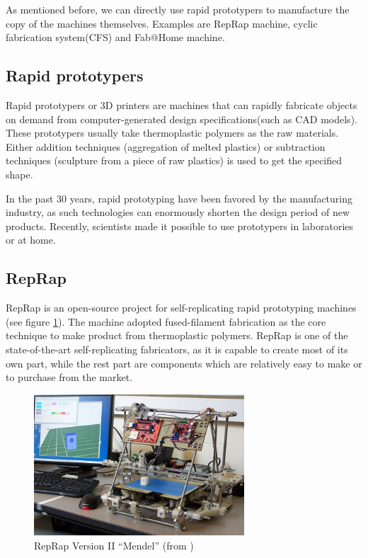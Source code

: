 \documentclass[12pt,twoside]{article}
\theoremstyle{plain}
\theoremstyle{definition}
\theoremstyle{remark}
\begin{document}
As mentioned before, we can directly use rapid prototypers to manufacture the copy of the machines themselves. Examples are RepRap machine\cite{jones_reprap_2011}, cyclic fabrication system(CFS)\cite{moses_towards_2009} and Fab@Home machine\cite{malone_fabhome:_2007}.

\subsection{Rapid prototypers}
Rapid prototypers or 3D printers are machines that can rapidly fabricate objects on demand from computer-generated design specifications(such as CAD models)\cite{lipson_homemade_2005}. These prototypers usually take thermoplastic polymers as the raw materials. Either addition techniques (aggregation of melted plastics) or subtraction techniques (sculpture from a piece of raw plastics) is used to get the specified shape.

In the past 30 years, rapid prototyping have been favored by the manufacturing industry, as such technologies can enormously shorten the design period of new products. Recently, scientists made it possible to use prototypers in laboratories or at home.

\subsection{RepRap}
RepRap is an open-source project for self-replicating rapid prototyping machines\cite{jones_reprap_2011} (see figure \ref{fig:reprap}). The machine adopted fused-filament
fabrication as the core technique to make product from thermoplastic polymers.
RepRap is one of the state-of-the-art self-replicating fabricators, as it is capable to create most of its own part, while the rest part are components which are relatively easy to make or to purchase from the market.

\begin{figure}[b]
	 \centerline{\includegraphics[width=0.7\textwidth]{mendel}}
	 {\caption{RepRap Version II ``Mendel'' (from \cite{jones_reprap_2011})}
	 \label{fig:reprap}}
\end{figure}
\end{document}
